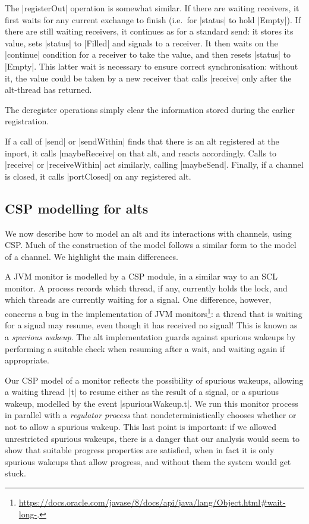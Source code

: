 The |registerOut| operation is somewhat similar.  If there are waiting
receivers, it first waits for any current exchange to finish (i.e.~for
|status| to hold |Empty|).  If there are still waiting receivers, it continues
as for a standard send: it stores its value, sets |status| to |Filled| and
signals to a receiver.  It then waits on the |continue| condition for a
receiver to take the value, and then resets |status| to |Empty|.  This latter
wait is necessary to ensure correct synchronisation: without it, the value
could be taken by a new receiver that calls |receive| only after the
alt-thread has returned.

The deregister operations simply clear the information stored during the
earlier registration.

If a call of |send| or |sendWithin| finds that there is an alt registered at
the inport, it calls |maybeReceive| on that alt, and reacts accordingly.
Calls to |receive| or |receiveWithin| act similarly, calling |maybeSend|.  
%
Finally, if a channel is closed, it calls |portClosed| on any registered alt. 


\subsection{CSP modelling for alts}

\inlineCSP

We now describe how to model an alt and its interactions with channels, using
CSP\@.  Much of the construction of the model follows a similar form to the
model of a channel.  We highlight the main differences. 

A JVM monitor is modelled by a CSP module, in a similar way to an SCL monitor.
A process records which thread, if any, currently holds the lock, and which
threads are currently waiting for a signal.  One difference, however, concerns
a bug in the implementation of JVM monitors\footnote{%
  \url{https://docs.oracle.com/javase/8/docs/api/java/lang/Object.html#wait-long-}.}:
a thread that is waiting for a signal may resume, even though it has received
no signal!  This is known as a \emph{spurious wakeup}.  The alt implementation
guards against spurious wakeups by performing a suitable check when resuming
after a wait, and waiting again if appropriate.

Our CSP model of a monitor reflects the possibility of spurious wakeups,
allowing a waiting thread~|t| to resume either as the result of a signal, or a
spurious wakeup, modelled by the event |spuriousWakeup.t|.  We run this
monitor process in parallel with a \emph{regulator process}  that nondeterministically chooses whether or not
to allow a spurious wakeup.  This last point is important: if we allowed
unrestricted spurious wakeups, there is a danger that our analysis would seem
to show that suitable progress properties are satisfied, when in fact it is
only spurious wakeups that allow progress, and without them the system would
get stuck.

